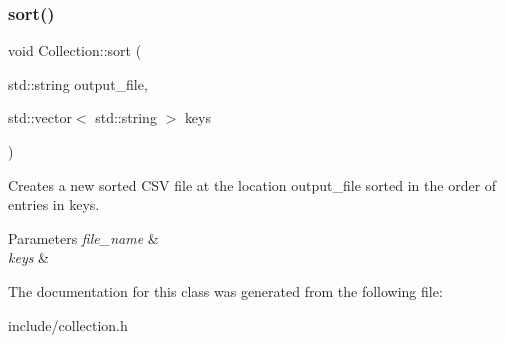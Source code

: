 \subsubsection{\texorpdfstring{sort()}{sort()}}
{\footnotesize\ttfamily void Collection\+::sort (\begin{DoxyParamCaption}\item[{std\+::string}]{output\+\_\+file,  }\item[{std\+::vector$<$ std\+::string $>$}]{keys }\end{DoxyParamCaption})}

Creates a new sorted C\+SV file at the location {\ttfamily output\+\_\+file} sorted in the order of entries in {\ttfamily keys}.


\begin{DoxyParams}{Parameters}
{\em file\+\_\+name} & \\
\hline
{\em keys} & \\
\hline
\end{DoxyParams}


The documentation for this class was generated from the following file\+:\begin{DoxyCompactItemize}
\item 
include/collection.\+h\end{DoxyCompactItemize}
